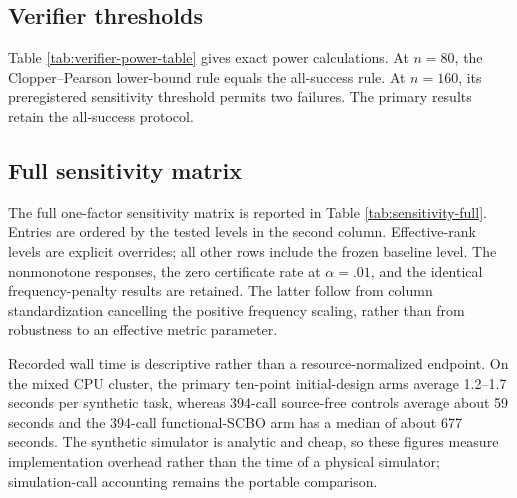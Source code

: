 \subsection{Verifier thresholds}

Table \ref{tab:verifier-power-table} gives exact power calculations.  At
$n=80$, the Clopper--Pearson lower-bound rule equals the all-success rule.  At
$n=160$, its preregistered sensitivity threshold permits two failures.  The
primary results retain the all-success protocol.

\begin{table}[htbp]
\centering
\small
\caption{Exact candidate-wise certificate power at budgets 80 and 160.}
\label{tab:verifier-power-table}

\end{table}

\subsection{Full sensitivity matrix}

The full one-factor sensitivity matrix is reported in Table
\ref{tab:sensitivity-full}.  Entries are ordered by the tested levels in the
second column.  Effective-rank levels are explicit overrides; all other rows
include the frozen baseline level.  The nonmonotone responses, the zero
certificate rate at $\alpha=.01$, and the identical frequency-penalty results
are retained.  The latter follow from column standardization cancelling the
positive frequency scaling, rather than from robustness to an effective
metric parameter.

\begin{table}[htbp]
\centering
\scriptsize
\caption{One-factor sensitivity of the source-scored design at $d=1000$.
Each rate aggregates eight fixed regime strata and 20 independently seeded
latent tasks per regime at one resolution.}
\label{tab:sensitivity-full}
\resizebox{0.98\textwidth}{!}{}
\end{table}

Recorded wall time is descriptive rather than a resource-normalized endpoint.
On the mixed CPU cluster, the primary ten-point initial-design arms average
1.2--1.7 seconds per synthetic task, whereas 394-call source-free controls
average about 59 seconds and the 394-call functional-SCBO arm has a median of
about 677 seconds.  The synthetic simulator is analytic and cheap, so these
figures measure implementation overhead rather than the time of a physical
simulator; simulation-call accounting remains the portable comparison.

